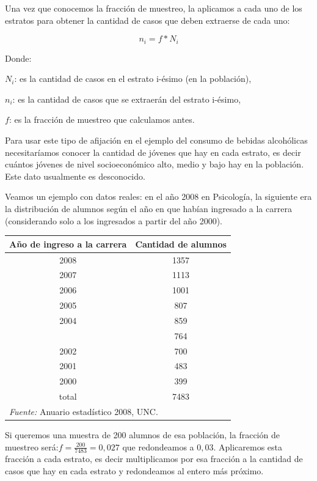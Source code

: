\documentclass[]{book}
\begin{document}
Una vez que conocemos la fracción de muestreo, la aplicamos a cada uno
de los estratos para obtener la cantidad de casos que deben extraerse de
cada uno:

\[n_{i} = f*N_{i}\]

Donde:

\(N_{i}\): es la cantidad de casos en el estrato i-ésimo (en la población),

\(n_{i}\): es la cantidad de casos que se extraerán del estrato i-ésimo,

\(f\): es la fracción de muestreo que calculamos antes.

Para usar este tipo de afijación en el ejemplo del consumo de bebidas
alcohólicas necesitaríamos conocer la cantidad de jóvenes que hay en
cada estrato, es decir cuántos jóvenes de nivel socioeconómico alto,
medio y bajo hay en la población. Este dato usualmente es desconocido.

Veamos un ejemplo con datos reales: en el año 2008 en Psicología, la
siguiente era la distribución de alumnos según el año en que habían
ingresado a la carrera (considerando solo a los ingresados a partir del
año 2000).

\begin{table}[H]
\centering
\begin{tabular}{cc}
\toprule
Año de ingreso a la carrera & Cantidad de alumnos\\
\midrule
\rowcolor{gray!6}  2008 & 1357\\
2007 & 1113\\
\rowcolor{gray!6}  2006 & 1001\\
2005 & 807\\
\rowcolor{gray!6}  2004 & 859\\
\addlinespace
2003 & 764\\
\rowcolor{gray!6}  2002 & 700\\
2001 & 483\\
\rowcolor{gray!6}  2000 & 399\\
total & 7483\\
\bottomrule
\multicolumn{2}{l}{\textit{Fuente: } Anuario estadístico 2008, UNC.}\\
\end{tabular}
\end{table}

Si queremos una muestra de 200 alumnos de esa población, la fracción de
muestreo será:\(f = \frac{200}{7483} = 0,027\) que redondeamos a \(0,03\).
Aplicaremos esta fracción a cada estrato, es decir multiplicamos por esa
fracción a la cantidad de casos que hay en cada estrato y redondeamos al
entero más próximo.
\end{document}
